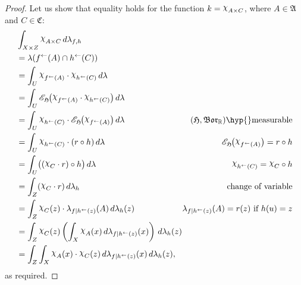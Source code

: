 \documentclass[
twoside=true,
paper=letter,
fontsize=11pt,
pagesize=auto,
leqno,
openany,
headsepline,
overfullrule,
]{scrbook}
\theoremstyle{plain}
\theoremstyle{plain}
\theoremstyle{definition}
\theoremstyle{bfnoteitalic}
\theoremstyle{bfnoteroman}
\newcommand{\sigalg}[1]{\mathfrak{#1}}
\newcommand{\cali}[1]{\mathscr{#1}}
\newcommand{\condexpsub}[2]
{\mathop{\cali{E}\hspace{-1.5pt}}\nolimits_{#2}\hspace{-1pt}#1}
\newcommand{\borel}{\mathfrak{Bor}}
\newcommand{\charfunction}[1]{{\raisebox{2pt}{$\chi$}}_{#1}}
\newcommand{\preimage}[1]{#1^{\leftarrow}}
\newcommand{\R}{\mathbb{R}}
\newcommand{\meets}{\cap}
\newcommand{\sigmaalgebra}{\sigalg{A}}
\newcommand{\sigmaalgebraiii}{\sigalg{C}}
\newcommand{\function}{f}
\newcommand{\functioniii}{h}
\newcommand{\functioniv}{k}
\newcommand{\measurespace}{X}
\newcommand{\measurespaceiii}{Z}
\newcommand{\mspaceelt}{x}
\newcommand{\mspaceeltiii}{z}
\newcommand{\measureiii}{\lambda}
\newcommand{\seti}{A}
\newcommand{\setiii}{C}
\newcommand{\mkernel}[3]{#1_{#2\mid#3}}
\newcommand{\uspace}{U}%
\newcommand{\uspaceelt}{u}
\begin{document}
\begin{proof}
Let us show that equality  holds for the function
$\functioniv = \charfunction{\seti\times\setiii}$,
where $\seti\in\sigmaalgebra$ and $\setiii\in\sigmaalgebraiii$:
\begin{align*}
& \int_{\measurespace\times\measurespaceiii}
\charfunction{\seti\times\setiii}
\, d \measureiii_{\function,\functioniii}
\\
& = \measureiii( \preimage{\function}(\seti) \meets \preimage{\functioniii}(\setiii) )
\\
& = \int_\uspace 
\charfunction{\preimage{\function}(\seti)}\cdot 
\charfunction{\preimage{\functioniii}(\setiii)}
\, d\measureiii
&
\\
& = \int_\uspace 
\condexpsub{\bigl(\charfunction{\preimage{\function}(\seti)}\cdot 
\charfunction{\preimage{\functioniii}(\setiii)}\bigr)}
{\sigalg{H}}
\, d\measureiii
&
\\
& = \int_\uspace
\charfunction{\preimage{\functioniii}(\setiii)}\cdot
\condexpsub{\bigl(\charfunction{\preimage{\function}(\seti)}\bigr)}
{\sigalg{H}}
\, d\measureiii
& \text{$(\sigalg{H},\borel_\R)$\hyp{}measurable}
\\
& = \int_\uspace
\charfunction{\preimage{\functioniii}(\setiii)}\cdot
(r\circ\functioniii)
\, d\measureiii
& \text{$\condexpsub{\bigl(\charfunction{\preimage{\function}(\seti)}\bigr)}
{\sigalg{H}}=r\circ\functioniii$}
\\
& = \int_\uspace
\bigl( (\charfunction{\setiii}\cdot r)\circ \functioniii \bigr)
\, d\measureiii
& \text{$\charfunction{\preimage{\functioniii}(\setiii)} = \charfunction{\setiii}\circ \functioniii$}
\\
& = \int_\measurespaceiii
(\charfunction{\setiii}\cdot r) 
\, d\measureiii_{\functioniii}
& \text{change of variable}
\\
& = \int_\measurespaceiii
\charfunction{\setiii}(\mspaceeltiii)\cdot 
\mkernel{\measureiii}{\function}{\preimage{\functioniii}(\mspaceeltiii)}(\seti)
\, d\measureiii_{\functioniii}(\mspaceeltiii)
&
\makebox[0pt][r]{$\mkernel{\measureiii}{\function}{\preimage{\functioniii}(\mspaceeltiii)}(\seti) = r(\mspaceeltiii)$ if $\functioniii(\uspaceelt) = \mspaceeltiii$}
\\
& = \int_\measurespaceiii
\charfunction{\setiii}(\mspaceeltiii)
\left( 
\int_\measurespace
\charfunction{\seti}(\mspaceelt)
\, d\mkernel{\measureiii}{\function}{\preimage{\functioniii}(\mspaceeltiii)}(\mspaceelt)
\right)
\, d\measureiii_{\functioniii}(\mspaceeltiii)
& 
\\
& = \int_\measurespaceiii
\int_\measurespace
\charfunction{\seti}(\mspaceelt)\cdot
\charfunction{\setiii}(\mspaceeltiii)
\, d\mkernel{\measureiii}{\function}{\preimage{\functioniii}(\mspaceeltiii)}(\mspaceelt)
\, d\measureiii_{\functioniii}(\mspaceeltiii),
\end{align*}
as required.
\end{proof}
\end{document}
